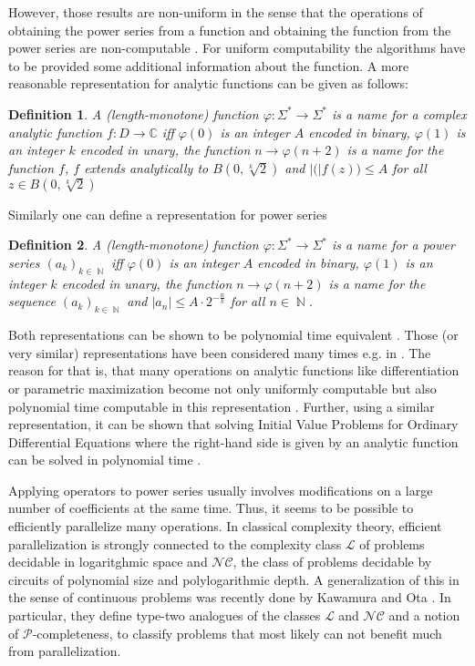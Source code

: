 \documentclass{article}
\newcommand{\CC}{\mathbb C}
\DeclareMathOperator{\NN}{\mathbb N}
\newcommand{\abs}[1]{\left|#1\right|}
\newcommand{\p}{\ensuremath{\mathcal P}\xspace}
\newcommand{\cl}{\ensuremath{\mathcal{L}}\xspace}
\newcommand{\nc}{\ensuremath{\mathcal{NC}}\xspace}
\newtheorem{definition}{Definition}
\begin{document}
However, those results are non-uniform in the sense that the operations of obtaining the power series from a function and obtaining the function from the power series are non-computable \cite{Mueller87}.
For uniform computability the algorithms have to be provided some additional information about the function.
A more reasonable representation for analytic functions can be given as follows: 
\begin{definition}\label{def:function}
  A (length-monotone) function $\varphi: \Sigma^* \to \Sigma^*$ is a name for a complex analytic function $f:D \to \CC$ iff
  $\varphi(0)$ is an integer $A$ encoded in binary,
  $\varphi(1)$ is an integer $k$ encoded in unary,
  the function $n \to \varphi(n+2)$ is a name for the function $f$,
  $f$ extends analytically to $B(0, \sqrt[k]{2})$ and
  $\abs(f(z)) \leq A$ for all $z \in B(0, \sqrt[k]{2})$

\end{definition}
Similarly one can define a representation for power series 
\begin{definition}\label{def:powerseries}
  A (length-monotone) function $\varphi: \Sigma^* \to \Sigma^*$ is a name for a power series $(a_k)_{k \in \NN}$ iff
  $\varphi(0)$ is an integer $A$ encoded in binary,
  $\varphi(1)$ is an integer $k$ encoded in unary,
  the function $n \to \varphi(n+2)$ is a name for the sequence $(a_k)_{k \in \NN}$ and
  $\abs{a_n} \leq A \cdot 2^{-\frac{n}{k}}$ for all $n \in \NN$.
\end{definition}
Both representations can be shown to be polynomial time equivalent \cite{Kawamura2012}.
Those (or very similar) representations have been considered many times e.g. in \cite{Mueller95, Kawamura2012,DBLP:journals/corr/PaulyS15,DBLP:journals/jsc/Hoeven05}.
The reason for that is, that many operations on analytic functions like differentiation or parametric maximization become not only uniformly computable but also polynomial time computable in this representation \cite{Kawamura2012}.
Further, using a similar representation, it can be shown that solving Initial Value Problems for Ordinary Differential Equations where the right-hand side is given by an analytic function can be solved in polynomial time \cite{moiske1993solving}.

Applying operators to power series usually involves modifications on a large number of coefficients at the same time.
Thus, it seems to be possible to efficiently parallelize many operations.
In classical complexity theory, efficient parallelization is strongly connected to the complexity class \cl of problems decidable in logaritghmic space and \nc, the class of problems decidable by circuits of polynomial size and polylogarithmic depth.
A generalization of this in the sense of continuous problems was recently done by Kawamura and Ota \cite{Kawamura2014}.
In particular, they define type-two analogues of the classes \cl and \nc and a notion of \p-completeness, to classify problems that most likely can not benefit much from parallelization.
\end{document}
